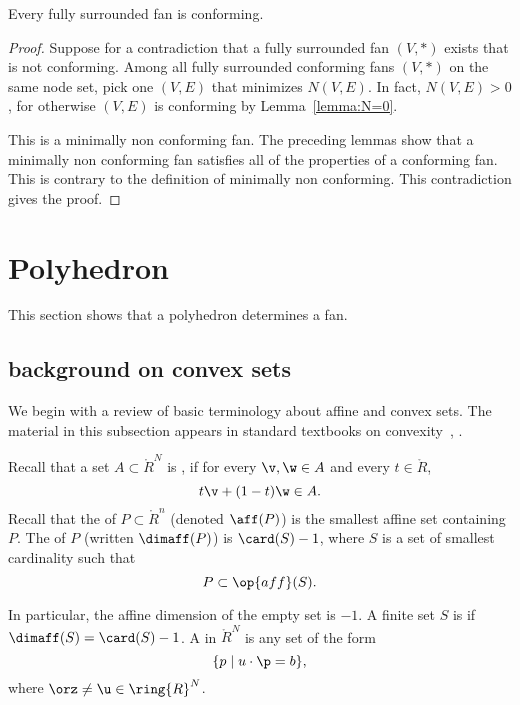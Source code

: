 \begin{lemma}[conformance]\label{lemma:face}
Every fully surrounded fan is conforming.
\end{lemma}

\begin{proof}
Suppose for a contradiction that a fully surrounded fan $(V,*)$
exists that is not conforming.  Among all fully surrounded
conforming fans $(V,*)$ on the same node set, pick one $(V,E)$
that minimizes $N(V,E)$.  In fact, $N(V,E)>0$, for otherwise $(V,E)$
is conforming by Lemma~\ref{lemma:N=0}.

This is a minimally non conforming fan.  The preceding lemmas show
that a minimally non conforming fan satisfies all of the properties
of a conforming fan.  This is contrary to the definition of
minimally non conforming.  This contradiction gives the proof.
\end{proof}



\section{Polyhedron}\label{sec:poly}

This section shows that a polyhedron determines a fan. 



\subsection{background on convex sets}

We begin with a review of basic terminology about affine and convex
sets.  The material in this subsection appears in standard textbooks
on convexity~\cite{unknown}, \cite{unknown}. %

\begin{definition}\label{def:affine}
Recall that a set $A\subset\ring{R}^N$ is , if for
every $\v,\w\in A$ and every $t \in \ring{R}$, 
\begin{displaymath}
  t \v + (1-t) \w \in A.
\end{displaymath}
Recall that
the  of $P\subset\ring{R}^n$ (denoted $\aff(P)$) 
is the smallest affine set
containing $P$.  The  of $P$ (written $\dimaff(P)$) is
$\card(S)-1$, where $S$ is a set of smallest cardinality such that
\begin{displaymath}
P \subset \op{aff}(S).
\end{displaymath}
\end{definition}
In particular, the affine dimension of the empty set is $-1$.
A finite set $S$ is  if $\dimaff(S) = \card(S)-1$.
A  in $\ring{R}^N$ is any set of the form
\begin{displaymath}
\{p\mid u\cdot \p = b\},
\end{displaymath}
where $\orz\ne\u\in\ring{R}^N$.
%
%



